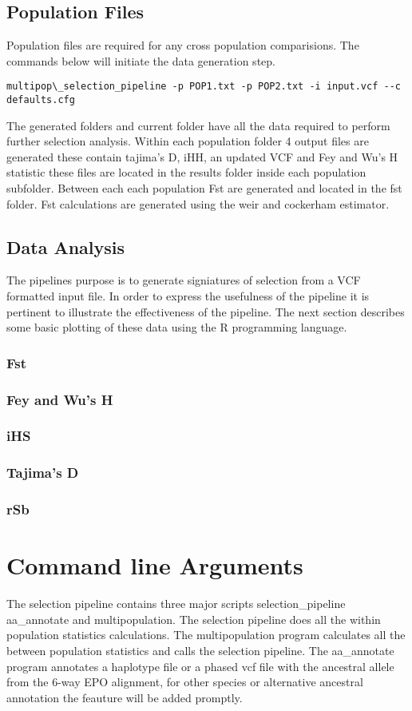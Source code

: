 \documentclass[a4paper,10pt]{article}
\begin{document}
\subsection{Population Files}
Population files are required for any cross population comparisions. The commands below will initiate the data generation step.\\
\begin{verbatim}
multipop\_selection_pipeline -p POP1.txt -p POP2.txt -i input.vcf --c defaults.cfg
\end{verbatim}
The generated folders and current folder have all the data required to perform further selection analysis. Within each population folder 4 output files are generated these contain tajima's D, iHH, an updated VCF and Fey and Wu's H statistic these files are located in the results folder inside each population subfolder. Between each each population Fst are generated and located in the fst folder. Fst calculations are generated using the weir and cockerham estimator.
\subsection{Data Analysis}
The pipelines purpose is to generate signiatures of selection from a VCF formatted input file. In order to express the usefulness of the pipeline it is pertinent to illustrate the effectiveness of the pipeline. The next section describes some basic plotting of these data using the R programming language.
\subsubsection{Fst}
\subsubsection{Fey and Wu's H}
\subsubsection{iHS}
\subsubsection{Tajima's D}
\subsubsection{rSb}

\section{Command line Arguments}
The selection pipeline contains three major scripts selection\_pipeline aa\_annotate and multipopulation. The selection pipeline does all the within population statistics calculations. The multipopulation program calculates all the between population statistics and calls the selection pipeline. The aa\_annotate program annotates a haplotype file or a phased vcf file with the ancestral allele from the 6-way EPO alignment, for other species or alternative ancestral annotation the feauture will be added promptly.
\end{document}
